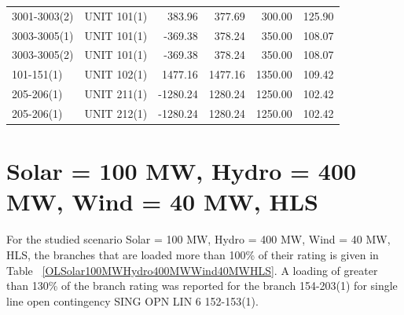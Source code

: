 \documentclass[10pt]{report}
\begin{document}
\begin{table}[H]
{\begin{tabular}{llrrrr}
3001-3003(2) & UNIT 101(1) & 383.96 & 377.69 & 300.00 & 125.90 \\
3003-3005(1) & UNIT 101(1) & -369.38 & 378.24 & 350.00 & 108.07 \\
3003-3005(2) & UNIT 101(1) & -369.38 & 378.24 & 350.00 & 108.07 \\
101-151(1) & UNIT 102(1) & 1477.16 & 1477.16 & 1350.00 & 109.42 \\
205-206(1) & UNIT 211(1) & -1280.24 & 1280.24 & 1250.00 & 102.42 \\
205-206(1) & UNIT 212(1) & -1280.24 & 1280.24 & 1250.00 & 102.42 \\
\bottomrule
\end{tabular}}
\end{table}

\section{Solar = 100 MW, Hydro = 400 MW, Wind = 40 MW, HLS}
For the studied scenario Solar = 100 MW, Hydro = 400 MW, Wind = 40 MW, HLS, the branches that are loaded more than 100\% of their rating is given in Table ~\ref{OLSolar100MWHydro400MWWind40MWHLS}. A loading of greater than 130\% of the branch rating was reported for the branch 154-203(1) for single line open contingency SING OPN LIN   6 152-153(1).
\end{document}
